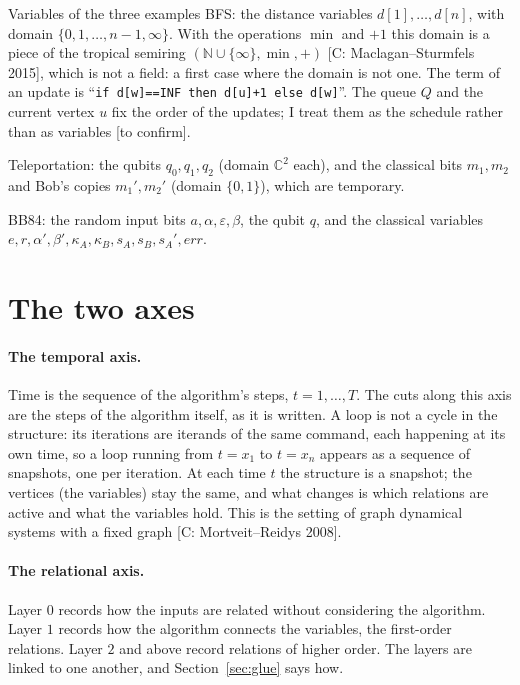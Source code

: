 \documentclass[11pt,a4paper]{article}
\newcommand{\gr}[1]{\textsf{[#1]}}
\newcommand{\tc}{\textsf{[to confirm]}}
\begin{document}
\begin{ex}{Variables of the three examples}
BFS: the distance variables $d[1],\dots,d[n]$, with domain $\{0,1,\dots,n-1,\infty\}$. With the operations $\min$ and $+1$ this domain is a piece of the tropical semiring $(\mathbb{N}\cup\{\infty\},\min,+)$ \gr{C: Maclagan--Sturmfels 2015}, which is not a field: a first case where the domain is not one. The term of an update is ``\texttt{if d[w]==INF then d[u]+1 else d[w]}''. The queue $Q$ and the current vertex $u$ fix the order of the updates; I treat them as the schedule rather than as variables \tc.

Teleportation: the qubits $q_0,q_1,q_2$ (domain $\mathbb{C}^2$ each), and the classical bits $m_1,m_2$ and Bob's copies $m_1',m_2'$ (domain $\{0,1\}$), which are temporary.

BB84: the random input bits $a,\alpha,\varepsilon,\beta$, the qubit $q$, and the classical variables $e,r,\alpha',\beta',\kappa_A,\kappa_B,s_A,s_B,s_A',\mathit{err}$.
\end{ex}

\section{The two axes}\label{sec:axes}

\paragraph{The temporal axis.} Time is the sequence of the algorithm's steps, $t=1,\dots,T$. The cuts along this axis are the steps of the algorithm itself, as it is written. A loop is not a cycle in the structure: its iterations are iterands of the same command, each happening at its own time, so a loop running from $t=x_1$ to $t=x_n$ appears as a sequence of snapshots, one per iteration. At each time $t$ the structure is a snapshot; the vertices (the variables) stay the same, and what changes is which relations are active and what the variables hold. This is the setting of graph dynamical systems with a fixed graph \gr{C: Mortveit--Reidys 2008}.

\paragraph{The relational axis.} Layer $0$ records how the inputs are related without considering the algorithm. Layer $1$ records how the algorithm connects the variables, the first-order relations. Layer $2$ and above record relations of higher order. The layers are linked to one another, and Section~\ref{sec:glue} says how.
\end{document}
